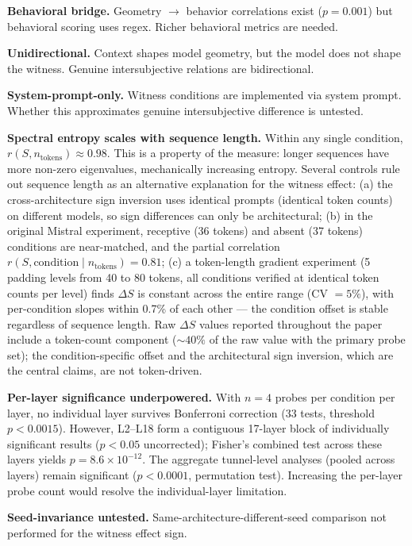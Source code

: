 \documentclass[12pt]{article}
\begin{document}
\textbf{Behavioral bridge.} Geometry $\to$ behavior correlations exist ($p = 0.001$) but behavioral scoring uses regex. Richer behavioral metrics are needed.

\textbf{Unidirectional.} Context shapes model geometry, but the model does not shape the witness. Genuine intersubjective relations are bidirectional.

\textbf{System-prompt-only.} Witness conditions are implemented via system prompt. Whether this approximates genuine intersubjective difference is untested.

\textbf{Spectral entropy scales with sequence length.} Within any single condition, $r(S, n_{\text{tokens}}) \approx 0.98$. This is a property of the measure: longer sequences have more non-zero eigenvalues, mechanically increasing entropy. Several controls rule out sequence length as an alternative explanation for the witness effect: (a) the cross-architecture sign inversion uses identical prompts (identical token counts) on different models, so sign differences can only be architectural; (b) in the original Mistral experiment, receptive (36 tokens) and absent (37 tokens) conditions are near-matched, and the partial correlation $r(S, \text{condition} \mid n_{\text{tokens}}) = 0.81$; (c) a token-length gradient experiment (5 padding levels from 40 to 80 tokens, all conditions verified at identical token counts per level) finds $\Delta S$ is constant across the entire range (CV $= 5\%$), with per-condition slopes within 0.7\% of each other --- the condition offset is stable regardless of sequence length. Raw $\Delta S$ values reported throughout the paper include a token-count component (${\sim}40\%$ of the raw value with the primary probe set); the condition-specific offset and the architectural sign inversion, which are the central claims, are not token-driven.

\textbf{Per-layer significance underpowered.} With $n=4$ probes per condition per layer, no individual layer survives Bonferroni correction (33 tests, threshold $p < 0.0015$). However, L2--L18 form a contiguous 17-layer block of individually significant results ($p < 0.05$ uncorrected); Fisher's combined test across these layers yields $p = 8.6 \times 10^{-12}$. The aggregate tunnel-level analyses (pooled across layers) remain significant ($p < 0.0001$, permutation test). Increasing the per-layer probe count would resolve the individual-layer limitation.

\textbf{Seed-invariance untested.} Same-architecture-different-seed comparison not performed for the witness effect sign.
\end{document}
